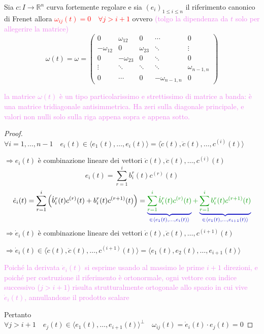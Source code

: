         \newpage
        \begin{proposizione}
        Sia $c: I \to \mathbb{R}^n$ curva fortemente regolare e sia $\left(e_i\right)_{1 \leq i \leq n}$ il riferimento canonico di Frenet allora
        \textcolor{red}{$\omega_{ij} (t) =0 \quad \forall j > i+1$} ovvero \textcolor{violet}{(tolgo la dipendenza da $t$ solo per allegerire la matrice)}
        $$ \omega(t) = \omega =  \begin{pmatrix} 0 & \omega_{12} & 0 & \cdots & 0 \\ -\omega_{12} & 0 & \omega_{23} & \ddots & \vdots \\ 0 & -\omega_{23} & 0 & \ddots & 0 \\ \vdots & \ddots & \ddots & \ddots & \omega_{n-1,n} \\ 0 & \cdots & 0 & -\omega_{n-1,n} & 0 \end{pmatrix}$$
        \end{proposizione}
        \textcolor{violet}{la matrice $\omega(t)$ è un tipo particolarissimo e strettissimo di matrice a banda: è una matrice tridiagonale antisimmetrica. Ha zeri sulla diagonale principale, e valori non nulli solo sulla riga appena sopra e appena sotto.}
        \begin{proof}
        \mbox{}

        $\forall i = 1, \dots, n-1 \quad e_i(t) \in \langle e_1(t), \dots, e_i(t) \rangle = \langle \dot{c}(t), \ddot{c}(t), \dots, c^{(i)}(t) \rangle$

        $\Rightarrow e_i(t)$ è combinazione lineare dei vettori $\dot{c}(t), \ddot{c}(t), \dots, c^{(i)}(t)$
        \[ e_i(t) = \sum_{r=1}^{i} b_i^r(t) c^{(r)}(t) \]
        \[ \dot{e}_i(t) = \sum_{r=1}^{i} \left( \dot{b}_i^r(t) c^{(r)}(t) + b_i^r(t) c^{(r+1)}(t) \right) =
         \color{blu} \underbrace{ \textcolor{verde}{\sum_{r=1}^{i} \dot{b}_i^r(t) c^{(r)}(t)}}_{\in \langle e_1(t), \dots, e_i(t) \rangle} \textcolor{verde}{+}
          \underbrace{\textcolor{verde}{\sum_{r=1}^{i} b_i^r(t) c^{(r+1)}(t)}}_{\in \langle e_1(t), \dots, e_{i+1}(t) \rangle} \]
        $\Rightarrow \dot{e}_i(t)$ è combinazione lineare dei vettori $\dot{c}(t), \ddot{c}(t), \dots, c^{(i+1)}(t)$
        
        $\Rightarrow \dot{e}_i(t) \in \langle \dot{c}(t), \ddot{c}(t), \dots, c^{(i+1)}(t) \rangle = \langle e_1(t), e_2(t), \dots, e_{i+1}(t) \rangle $

        \textcolor{violet}{Poiché la derivata $\dot{e}_i(t)$ si esprime usando al massimo le prime $i+1$ direzioni, e poiché per costruzione
         il riferimento è ortonormale, ogni vettore con indice successivo ($j > i+1$) risulta strutturalmente ortogonale allo spazio in cui vive
          $\dot{e}_i(t)$, annullandone il prodotto scalare}    

        Pertanto $\forall j > i+1 \quad e_j(t) \in \langle e_1(t), \dots, e_{i+1}(t) \rangle^\perp \quad \omega_{ij}(t) = \dot{e}_i(t) \cdot e_j(t) = 0$
        \end{proof}
